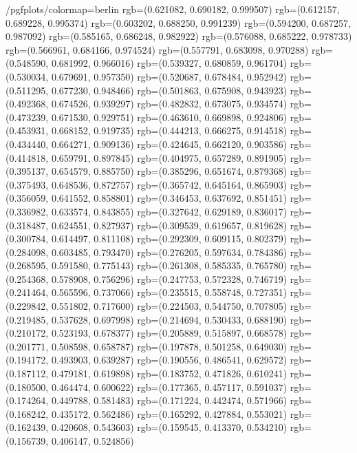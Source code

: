 {{			/pgfplots/colormap={berlin}{%
					rgb=(0.621082, 0.690182, 0.999507)
					rgb=(0.612157, 0.689228, 0.995374)
					rgb=(0.603202, 0.688250, 0.991239)
					rgb=(0.594200, 0.687257, 0.987092)
					rgb=(0.585165, 0.686248, 0.982922)
					rgb=(0.576088, 0.685222, 0.978733)
					rgb=(0.566961, 0.684166, 0.974524)
					rgb=(0.557791, 0.683098, 0.970288)
					rgb=(0.548590, 0.681992, 0.966016)
					rgb=(0.539327, 0.680859, 0.961704)
					rgb=(0.530034, 0.679691, 0.957350)
					rgb=(0.520687, 0.678484, 0.952942)
					rgb=(0.511295, 0.677230, 0.948466)
					rgb=(0.501863, 0.675908, 0.943923)
					rgb=(0.492368, 0.674526, 0.939297)
					rgb=(0.482832, 0.673075, 0.934574)
					rgb=(0.473239, 0.671530, 0.929751)
					rgb=(0.463610, 0.669898, 0.924806)
					rgb=(0.453931, 0.668152, 0.919735)
					rgb=(0.444213, 0.666275, 0.914518)
					rgb=(0.434440, 0.664271, 0.909136)
					rgb=(0.424645, 0.662120, 0.903586)
					rgb=(0.414818, 0.659791, 0.897845)
					rgb=(0.404975, 0.657289, 0.891905)
					rgb=(0.395137, 0.654579, 0.885750)
					rgb=(0.385296, 0.651674, 0.879368)
					rgb=(0.375493, 0.648536, 0.872757)
					rgb=(0.365742, 0.645164, 0.865903)
					rgb=(0.356059, 0.641552, 0.858801)
					rgb=(0.346453, 0.637692, 0.851451)
					rgb=(0.336982, 0.633574, 0.843855)
					rgb=(0.327642, 0.629189, 0.836017)
					rgb=(0.318487, 0.624551, 0.827937)
					rgb=(0.309539, 0.619657, 0.819628)
					rgb=(0.300784, 0.614497, 0.811108)
					rgb=(0.292309, 0.609115, 0.802379)
					rgb=(0.284098, 0.603485, 0.793470)
					rgb=(0.276205, 0.597634, 0.784386)
					rgb=(0.268595, 0.591580, 0.775143)
					rgb=(0.261308, 0.585335, 0.765780)
					rgb=(0.254368, 0.578908, 0.756296)
					rgb=(0.247753, 0.572328, 0.746719)
					rgb=(0.241464, 0.565596, 0.737066)
					rgb=(0.235515, 0.558748, 0.727351)
					rgb=(0.229842, 0.551802, 0.717600)
					rgb=(0.224503, 0.544750, 0.707805)
					rgb=(0.219485, 0.537628, 0.697998)
					rgb=(0.214694, 0.530433, 0.688190)
					rgb=(0.210172, 0.523193, 0.678377)
					rgb=(0.205889, 0.515897, 0.668578)
					rgb=(0.201771, 0.508598, 0.658787)
					rgb=(0.197878, 0.501258, 0.649030)
					rgb=(0.194172, 0.493903, 0.639287)
					rgb=(0.190556, 0.486541, 0.629572)
					rgb=(0.187112, 0.479181, 0.619898)
					rgb=(0.183752, 0.471826, 0.610241)
					rgb=(0.180500, 0.464474, 0.600622)
					rgb=(0.177365, 0.457117, 0.591037)
					rgb=(0.174264, 0.449788, 0.581483)
					rgb=(0.171224, 0.442474, 0.571966)
					rgb=(0.168242, 0.435172, 0.562486)
					rgb=(0.165292, 0.427884, 0.553021)
					rgb=(0.162439, 0.420608, 0.543603)
					rgb=(0.159545, 0.413370, 0.534210)
					rgb=(0.156739, 0.406147, 0.524856)
}}}
